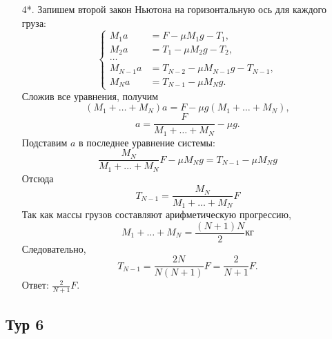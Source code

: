 \documentclass[12pt]{article} %
\begin{document}
\begin{enumerate}
\item[4*.]
    Запишем второй закон Ньютона на горизонтальную ось для каждого груза:
    \[
        \begin{cases}
            M_1 a &= F   - \mu M_1 g - T_1, \\
            M_2 a &= T_1 - \mu M_2 g - T_2,\\
            \ldots \\ %
            M_{N-1} a &= T_{N-2} - \mu M_{N-1} g - T_{N-1},\\
            M_{N}   a &= T_{N-1} - \mu M_{N} g.
        \end{cases}
    \]
    Сложив все уравнения, получим
    \[
        (M_1 + \ldots + M_N) a = F - \mu g (M_1 + \ldots + M_N),
    \]
    \[
        a = \frac{F}{M_1 + \ldots + M_N} - \mu g.
    \]
    Подставим $a$ в последнее уравнение системы:
    \[
        \frac{M_N}{M_1 + \ldots + M_N}F - \mu M_N g = T_{N-1} - \mu M_N g
    \]
    Отсюда 
    \[
        T_{N-1} = \frac{M_N}{M_1 + \ldots + M_N}F
    \]
    Так как массы грузов составляют арифметическую прогрессию,
    \[
        M_1 + \ldots + M_N = \frac{(N+1)N}{2} \text{кг}
    \]
    Следовательно,
    \[
        T_{N-1} = \frac{2N}{N(N+1)} F = \frac{2}{N+1} F.
    \]
    Ответ: $\frac{2}{N+1} F$.
    
\end{enumerate}

\subsection*{Тур 6}
\end{document}
